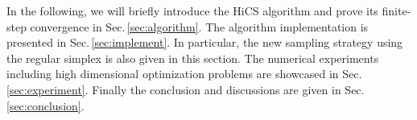 %
%
%

In the following, we will briefly introduce the HiCS algorithm and
prove its finite-step convergence in Sec.\,\ref{sec:algorithm}. 
The algorithm implementation is presented in Sec.\,\ref{sec:implement}.
In particular, the new sampling strategy using the regular simplex is
also given in this section.
The numerical experiments including high dimensional optimization
problems are showcased in Sec.\,\ref{sec:experiment}. 
Finally the conclusion and discussions are given in Sec.\,\ref{sec:conclusion}.

